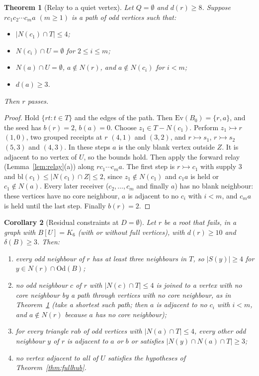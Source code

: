 \documentclass[11pt]{amsart}
\newtheorem{theorem}{Theorem}[section]
\newtheorem{corollary}[theorem]{Corollary}
\theoremstyle{definition}
\newcommand{\Ev}{\mathrm{Ev}}
\newcommand{\Od}{\mathrm{Od}}
\newcommand{\tr}{\rightarrowtail}   %
\newcommand{\bl}{\mathrm{bl}}
\begin{document}
\begin{theorem}[Relay to a quiet vertex]\label{thm:relay}
Let $Q=\emptyset$ and $d(r)\ge8$. Suppose $r c_1c_2\cdots c_m a$ $(m\ge1)$ is a path of odd
vertices such that:
\begin{itemize}
\item $|N(c_1)\cap T|\le4$;
\item $N(c_i)\cap U=\emptyset$ for $2\le i\le m$;
\item $N(a)\cap U=\emptyset$, $a\notin N(r)$, and $a\notin N(c_i)$ for $i<m$;
\item $d(a)\ge3$.
\end{itemize}
Then $r$ passes.
\end{theorem}
\begin{proof}
Hold $\{rt:t\in T\}$ and the edges of the path. Then $\Ev(B_0)=\{r,a\}$, and the seed has
$b(r)=2$, $b(a)=0$. Choose $z_1\in T-N(c_1)$. Perform $z_1\tr r$ $(1,0)$, two grouped receipts at
$r$ $(4,1)$ and $(3,2)$, and $r\tr s_1$, $r\tr s_2$ $(5,3)$ and $(4,3)$. In these steps $a$ is the
only blank vertex outside $Z$. It is adjacent to no vertex of $U$, so the bounds hold. Then apply
the forward relay (Lemma~\ref{lem:relay}(a)) along $rc_1\cdots c_ma$. The first step is
$r\tr c_1$ with supply $3$ and $\bl(c_1)\le|N(c_1)\cap Z|\le2$, since $z_1\notin N(c_1)$ and $c_1a$
is held or $c_1\notin N(a)$. Every later receiver ($c_2,\dots,c_m$ and finally $a$) has no blank neighbour: these vertices have
no core neighbour, $a$ is adjacent to no $c_i$ with $i<m$, and $c_ma$ is held until the last step.
Finally $b(r)=2$.
\end{proof}

\begin{corollary}[Residual constraints at $D=\emptyset$]\label{cor:residual}
Let $r$ be a root that fails, in a graph with $B[U]=K_6$ (with or without full vertices), with
$d(r)\ge10$ and $\delta(B)\ge3$. Then:
\begin{enumerate}[label=(\alph*)]
\item every odd neighbour of $r$ has at least three neighbours in $T$, so $|S(y)|\ge4$ for
$y\in N(r)\cap\Od(B)$;
\item no odd neighbour $c$ of $r$ with $|N(c)\cap T|\le4$ is joined to a vertex with no core
neighbour by a path through vertices with no core neighbour, as in Theorem~\ref{thm:relay} (take
a shortest such path; then $a$ is adjacent to no $c_i$ with $i<m$, and $a\notin N(r)$ because $a$
has no core neighbour);
\item for every triangle $rab$ of odd vertices with $|N(a)\cap T|\le4$, every other odd neighbour
$y$ of $r$ is adjacent to $a$ or $b$ or satisfies $|N(y)\cap N(a)\cap T|\ge3$;
\item no vertex adjacent to all of $U$ satisfies the hypotheses of Theorem~\ref{thm:fullhub}.
\end{enumerate}
\end{corollary}
\end{document}
